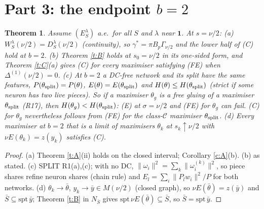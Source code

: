 \documentclass[11pt]{article}
\newtheorem{theorem}{Theorem}\newtheorem{lemma}[theorem]{Lemma}\newtheorem{proposition}[theorem]{Proposition}
\theoremstyle{remark}\newtheorem{remark}[theorem]{Remark}
\begin{document}
\section{Part 3: the endpoint $b=2$}
\begin{theorem}\label{t:D}
Assume $(E^\lambda_S)$ a.e.\ for all $S$ and $\lambda$ near $\mathbf 1$. At $s=\nu/2$:
(a) $W^\lambda_S(\nu/2)=D^\lambda_S(\nu/2)$ (continuity), so $\gamma^*=\pi B_p\Gamma_{\nu/2}$ and the lower half of (C) hold at $b=2$.
(b) Theorem \ref{t:B} holds at $s_0=\nu/2$ in its one-sided form, and Theorem \ref{t:C}(a) gives (C) for every maximiser satisfying
(FE) when $\Delta^{(1)}(\nu/2)=0$.
(c) At $b=2$ a DC-free network and its split have the same features, $P(\theta_{\rm split})=P(\theta)$,
$E(\theta)=E(\theta_{\rm split})$ and $H(\theta)\le H(\theta_{\rm split})$ (strict if some neuron has two live pieces).
So if a maximiser $\theta_g$ is a free gluing of a maximiser $\theta_{\rm split}$ (R17), then $H(\theta_g)<H(\theta_{\rm split})$:
(E) at $\sigma=\nu/2$ and (FE) for $\theta_g$ can fail. (C) for $\theta_g$ nevertheless follows from (FE) for the class-$\mathcal C$
maximiser $\theta_{\rm split}$.
(d) Every maximiser at $b=2$ that is a limit of maximisers $\theta_k$ at $s_k\uparrow\nu/2$ with $\nu E(\theta_k)=z(y_k)$
satisfies (C).
\end{theorem}
\begin{proof}
(a) Theorem \ref{t:A}(ii) holds on the closed interval; Corollary \ref{c:A}(b). (b) as stated. (c) SPLIT R1(a),(c); with no DC,
$\|\omega_i\|^2=\sum_k\|\omega_i^{(k)}\|^2$, so piece shares refine neuron shares (chain rule) and
$E_l=\sum_i\|P_lw_i\|^2/P$ for both networks. (d) $\theta_k\to\bar\theta$, $y_k\to\bar y\in M(\nu/2)$ (closed graph), so
$\nu E(\bar\theta)=z(\bar y)$ and $\bar S\subseteq\mathrm{spt}\,\bar y$; Theorem \ref{t:B} in $N_{\bar S}$ gives
$\mathrm{spt}\,\nu E(\bar\theta)\subseteq\bar S$, so $\bar S=\mathrm{spt}\,\bar y$.
\end{proof}
\end{document}
